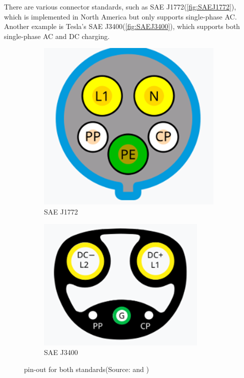 \documentclass[
english,
ruledheaders=section,%
class=report,%
thesis={type=Report},%
accentcolor=9c,%
custommargins=true,%
marginpar=false,%
parskip=half-,%
fontsize=11pt,%
logofile={img/tuda_logo.pdf}, %
]{tudapub}
\begin{document}

    There are various connector standards, such as SAE J1772(\autoref{fig:SAEJ1772}), which is implemented in North America but only supports single-phase AC. Another example is Tesla's SAE J3400(\autoref{fig:SAEJ3400}), which supports both single-phase AC and DC charging.

    \begin{figure}[htbp]
        \centering
        \begin{subfigure}[b]{0.4\textwidth}       \includegraphics[width=\textwidth]{img/SAEJ1772.jpg}
            \caption{SAE J1772}
            \label{fig:SAEJ1772}
        \end{subfigure}
        \hfill
        \begin{subfigure}[b]{0.4\textwidth}
            \includegraphics[width=\textwidth]{img/SAEJ3400.jpg}
            \caption{SAE J3400}
            \label{fig:SAEJ3400}
        \end{subfigure}
        \caption{pin-out for both standards(Source: \cite{SAEJ1772} and \cite{SAEJ3400})}
        \label{fig:2standardpinout}
    \end{figure}
\end{document}

